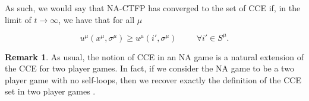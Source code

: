 \documentclass{article}
\theoremstyle{definition}
\newtheorem*{remark}{Remark}
\newcommand{\xmu}{x^{\mu}}
\newcommand{\refmu}{\sigma^{\mu}}
\begin{document}
  As such, we would say that NA-CTFP has converged to the set of CCE if, in the limit of $t
  \rightarrow \infty$, we have that for all $\mu$

  \begin{equation}
    u^\mu (\xmu, \refmu) \geq u^\mu(i', \refmu) \hspace{1cm} \forall i' \in S^\mu.
  \end{equation}

  \begin{remark}
    As usual, the notion of CCE in an NA game is a natural extension of the CCE for two player
    games. In fact, if we consider the NA game to be a two player game with no self-loops, then
    we recover exactly the definition of the CCE set in two player games \cite{PayoffPerformance}.
  \end{remark}
\end{document}
